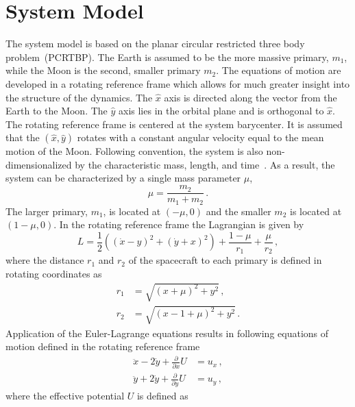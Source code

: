 \documentclass[letterpaper, paper,11pt]{AAS}		%
\begin{document}
\section{System Model}\label{sec:pcrtbp}
The system model is based on the planar circular restricted three body problem~(PCRTBP).
The Earth is assumed to be the more massive primary, \( m_1 \), while the Moon is the second, smaller primary \( m_2\).
The equations of motion are developed in a rotating reference frame which allows for much greater insight into the structure of the dynamics.
The \( \hat{x} \) axis is directed along the vector from the Earth to the Moon.
The \( \hat{y} \) axis lies in the orbital plane and is orthogonal to \( \hat{x} \).
The rotating reference frame is centered at the system barycenter.
It is assumed that the \(\left( \hat{x}, \hat{y}\right)\) rotates with a constant angular velocity equal to the mean motion of the Moon.
Following convention, the system is also non-dimensionalized by the characteristic mass, length, and time~\cite{koon2000}.
As a result, the system can be characterized by a single mass parameter \( \mu \),
\begin{equation}
	\mu = \frac{m_2}{m_1+m_2} \, .
	\label{eq:mass_param}
\end{equation}
The larger primary, \(m_1\), is located at \( \left(  -\mu , 0 \right)\) and the smaller \( m_2\) is located at \( \left( 1-\mu , 0 \right)\).
In the rotating reference frame the Lagrangian is given by
\begin{equation}
	L = \frac{1}{2} \left( \left( \dot{x} -y \right)^2 + \left( \dot{y} + x \right)^2 \right) + \frac{1-\mu}{r_1} + \frac{\mu}{r_2}\, ,
	\label{eq:lagrangian}
\end{equation}
where the distance \(r_1\) and \(r_2\) of the spacecraft to each primary is defined in rotating coordinates as
\begin{align}
	r_1 &= \sqrt{\left( x + \mu\right)^2 + y^2}\, , \\
	r_2 &= \sqrt{\left( x - 1 + \mu\right)^2 + y^2}\, .
	\label{eq:distances}
\end{align}
Application of the Euler-Lagrange equations results in following equations of motion defined in the rotating reference frame
\begin{align}
	\ddot{x} - 2 \dot{y} + \frac{\partial}{\partial x} U &= u_x \, ,\nonumber \\
	\ddot{y} + 2 \dot{y} + \frac{\partial}{\partial y} U &= u_y \, ,
	\label{eq:cont_eom}
\end{align}
where the effective potential \( U\) is defined as
\end{document}

